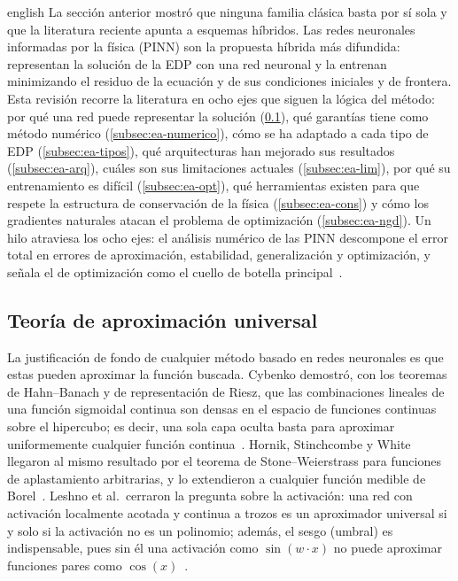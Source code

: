 \documentclass[0000.tex]{subfiles}
\begin{document}
\begin{hyphenrules}{english}
La sección anterior mostró que ninguna familia clásica basta por sí sola y que la literatura reciente apunta a esquemas híbridos. Las redes neuronales informadas por la física (PINN) son la propuesta híbrida más difundida: representan la solución de la EDP con una red neuronal y la entrenan minimizando el residuo de la ecuación y de sus condiciones iniciales y de frontera. Esta revisión recorre la literatura en ocho ejes que siguen la lógica del método: por qué una red puede representar la solución (\ref{subsec:ea-aprox}), qué garantías tiene como método numérico (\ref{subsec:ea-numerico}), cómo se ha adaptado a cada tipo de EDP (\ref{subsec:ea-tipos}), qué arquitecturas han mejorado sus resultados (\ref{subsec:ea-arq}), cuáles son sus limitaciones actuales (\ref{subsec:ea-lim}), por qué su entrenamiento es difícil (\ref{subsec:ea-opt}), qué herramientas existen para que respete la estructura de conservación de la física (\ref{subsec:ea-cons}) y cómo los gradientes naturales atacan el problema de optimización (\ref{subsec:ea-ngd}). Un hilo atraviesa los ocho ejes: el análisis numérico de las PINN descompone el error total en errores de aproximación, estabilidad, generalización y optimización, y señala el de optimización como el cuello de botella principal~\cite{de2024numerical}.

\subsection{Teoría de aproximación universal}
\label{subsec:ea-aprox}

La justificación de fondo de cualquier método basado en redes neuronales es que estas pueden aproximar la función buscada. Cybenko demostró, con los teoremas de Hahn--Banach y de representación de Riesz, que las combinaciones lineales de una función sigmoidal continua son densas en el espacio de funciones continuas sobre el hipercubo; es decir, una sola capa oculta basta para aproximar uniformemente cualquier función continua~\cite{cybenko1989approximation}. Hornik, Stinchcombe y White llegaron al mismo resultado por el teorema de Stone--Weierstrass para funciones de aplastamiento arbitrarias, y lo extendieron a cualquier función medible de Borel~\cite{hornik1989multilayer}. Leshno et al.\ cerraron la pregunta sobre la activación: una red con activación localmente acotada y continua a trozos es un aproximador universal si y solo si la activación no es un polinomio; además, el sesgo (umbral) es indispensable, pues sin él una activación como $\sin(w\cdot x)$ no puede aproximar funciones pares como $\cos(x)$~\cite{leshno1993multilayer}.


\end{hyphenrules}
\end{document}
